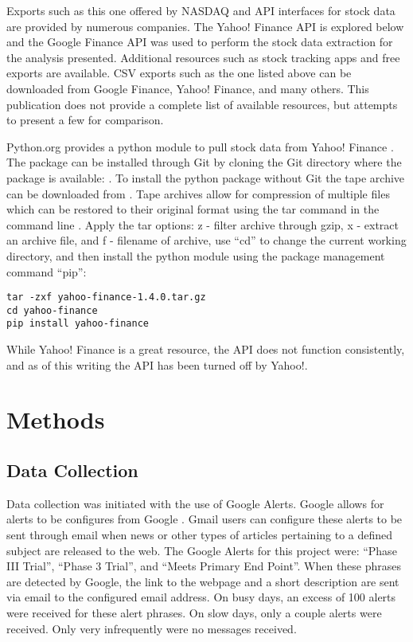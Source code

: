\documentclass[sigconf]{acmart}
\begin{document}
Exports such as this one offered by NASDAQ and API interfaces for stock data are provided by numerous companies. The Yahoo! Finance API is explored below and the Google Finance API was used to perform the stock data extraction for the analysis presented. Additional resources such as stock tracking apps and free exports are available. CSV exports such as the one listed above can be downloaded from Google Finance, Yahoo! Finance, and many others. This publication does not provide a complete list of available resources, but attempts to present a few for comparison. 

Python.org provides a python module to pull stock data from Yahoo! Finance \cite{www-python-yahoo}. The package can be installed through Git by cloning the Git directory where the package is available: \cite{www-yahooStock}. To install the python package without Git the tape archive can be downloaded from \cite{www-pythonYahooStock}.  Tape archives allow for compression of multiple files which can be restored to their original format using the tar command in the command line \cite{www-tar}.  Apply the tar options: z - filter archive through gzip, x - extract an archive file, and f - filename of archive, use ``cd'' to change the current working directory, and then install the python module using the package management command ``pip'':
\begin{verbatim}
tar -zxf yahoo-finance-1.4.0.tar.gz
cd yahoo-finance
pip install yahoo-finance
\end{verbatim}
While Yahoo! Finance is a great resource, the API does not function consistently, and as of this writing the API has been turned off by Yahoo!.


\section{Methods}
\subsection{Data Collection}
Data collection was initiated with the use of Google Alerts. Google allows for alerts to be configures from Google \cite{www-googleAlerts}. Gmail users can configure these alerts to be sent through email when news or other types of articles pertaining to a defined subject are released to the web. The Google Alerts for this project were: ``Phase III Trial'', ``Phase 3 Trial'', and ``Meets Primary End Point''. When these phrases are detected by Google, the link to the webpage and a short description are sent via email to the configured email address. On busy days, an excess of 100 alerts were received for these alert phrases. On slow days, only a couple alerts were received.  Only very infrequently were no messages received. 
\end{document}
